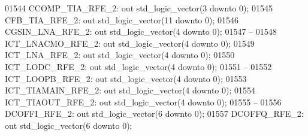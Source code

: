 \begin{DoxyCode}
01544         CCOMP\_TIA\_RFE\_2:    \textcolor{keywordflow}{out} \textcolor{comment}{std\_logic\_vector}(\textcolor{vhdllogic}{}\textcolor{vhdllogic}{3} \textcolor{keywordflow}{downto} \textcolor{vhdllogic}{}\textcolor{vhdllogic}{0});
01545         CFB\_TIA\_RFE\_2:  \textcolor{keywordflow}{out} \textcolor{comment}{std\_logic\_vector}(\textcolor{vhdllogic}{}\textcolor{vhdllogic}{11} \textcolor{keywordflow}{downto} \textcolor{vhdllogic}{}\textcolor{vhdllogic}{0});
01546         CGSIN\_LNA\_RFE\_2:    \textcolor{keywordflow}{out} \textcolor{comment}{std\_logic\_vector}(\textcolor{vhdllogic}{}\textcolor{vhdllogic}{4} \textcolor{keywordflow}{downto} \textcolor{vhdllogic}{}\textcolor{vhdllogic}{0});
01547 \textcolor{keyword}{        --}
01548         ICT\_LNACMO\_RFE\_2:   \textcolor{keywordflow}{out} \textcolor{comment}{std\_logic\_vector}(\textcolor{vhdllogic}{}\textcolor{vhdllogic}{4} \textcolor{keywordflow}{downto} \textcolor{vhdllogic}{}\textcolor{vhdllogic}{0});
01549         ICT\_LNA\_RFE\_2:  \textcolor{keywordflow}{out} \textcolor{comment}{std\_logic\_vector}(\textcolor{vhdllogic}{}\textcolor{vhdllogic}{4} \textcolor{keywordflow}{downto} \textcolor{vhdllogic}{}\textcolor{vhdllogic}{0});
01550         ICT\_LODC\_RFE\_2: \textcolor{keywordflow}{out} \textcolor{comment}{std\_logic\_vector}(\textcolor{vhdllogic}{}\textcolor{vhdllogic}{4} \textcolor{keywordflow}{downto} \textcolor{vhdllogic}{}\textcolor{vhdllogic}{0});
01551 \textcolor{keyword}{        --}
01552         ICT\_LOOPB\_RFE\_2:    \textcolor{keywordflow}{out} \textcolor{comment}{std\_logic\_vector}(\textcolor{vhdllogic}{}\textcolor{vhdllogic}{4} \textcolor{keywordflow}{downto} \textcolor{vhdllogic}{}\textcolor{vhdllogic}{0});
01553         ICT\_TIAMAIN\_RFE\_2:  \textcolor{keywordflow}{out} \textcolor{comment}{std\_logic\_vector}(\textcolor{vhdllogic}{}\textcolor{vhdllogic}{4} \textcolor{keywordflow}{downto} \textcolor{vhdllogic}{}\textcolor{vhdllogic}{0});
01554         ICT\_TIAOUT\_RFE\_2:   \textcolor{keywordflow}{out} \textcolor{comment}{std\_logic\_vector}(\textcolor{vhdllogic}{}\textcolor{vhdllogic}{4} \textcolor{keywordflow}{downto} \textcolor{vhdllogic}{}\textcolor{vhdllogic}{0});
01555 \textcolor{keyword}{        --}
01556         DCOFFI\_RFE\_2:   \textcolor{keywordflow}{out} \textcolor{comment}{std\_logic\_vector}(\textcolor{vhdllogic}{}\textcolor{vhdllogic}{6} \textcolor{keywordflow}{downto} \textcolor{vhdllogic}{}\textcolor{vhdllogic}{0});
01557         DCOFFQ\_RFE\_2:   \textcolor{keywordflow}{out} \textcolor{comment}{std\_logic\_vector}(\textcolor{vhdllogic}{}\textcolor{vhdllogic}{6} \textcolor{keywordflow}{downto} \textcolor{vhdllogic}{}\textcolor{vhdllogic}{0});

\end{DoxyCode}
